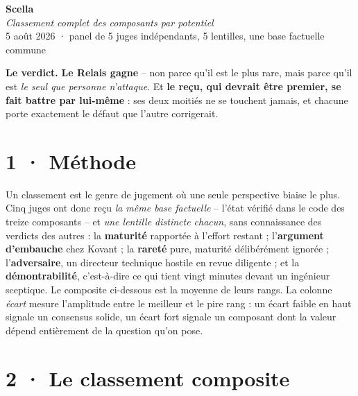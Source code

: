 \documentclass[10pt]{article}
\begin{document}
\begin{center}
{\Huge\bfseries\color{navy} Scella}\\[4pt]
{\large\color{grey}\itshape Classement complet des composants par potentiel}\\[4pt]
{\small\color{grey} 5 août 2026 \; · \; panel de 5 juges indépendants, 5 lentilles, une base factuelle commune}
\end{center}
\vspace{2pt}

\begin{these}
\textbf{Le verdict.} \textbf{Le Relais gagne} -- non parce qu'il est le plus rare, mais parce qu'il est
\emph{le seul que personne n'attaque}. Et \textbf{le reçu, qui devrait être premier, se fait battre par
lui-même} : ses deux moitiés ne se touchent jamais, et chacune porte exactement le défaut que l'autre
corrigerait.
\end{these}

\section{1 · Méthode}

Un classement est le genre de jugement où une seule perspective biaise le plus. Cinq juges ont donc reçu
\emph{la même base factuelle} -- l'état vérifié dans le code des treize composants -- et \emph{une
lentille distincte chacun}, sans connaissance des verdicts des autres : la \textbf{maturité} rapportée à
l'effort restant ; l'\textbf{argument d'embauche} chez Kovant ; la \textbf{rareté} pure, maturité
délibérément ignorée ; l'\textbf{adversaire}, un directeur technique hostile en revue diligente ; et la
\textbf{démontrabilité}, c'est-à-dire ce qui tient vingt minutes devant un ingénieur sceptique. Le
composite ci-dessous est la moyenne de leurs rangs. La colonne \emph{écart} mesure l'amplitude entre le
meilleur et le pire rang : un écart faible en haut signale un consensus solide, un écart fort signale un
composant dont la valeur dépend entièrement de la question qu'on pose.

\section{2 · Le classement composite}
\end{document}
